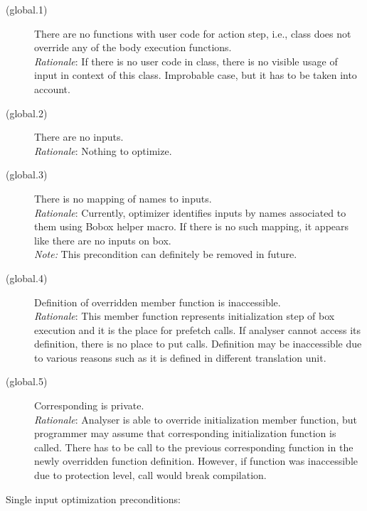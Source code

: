 \begin{description}
\item[(global.1)]{There are no functions with user code for action step, i.e., class does not override any of the body execution functions.\\
\emph{Rationale}: If there is no user code in class, there is no visible usage of input in context of this class. Improbable case, but it has to be taken into account. 
}

\item[(global.2)]{There are no inputs.\\
\emph{Rationale}: Nothing to optimize. 
}

\item[(global.3)]{There is no mapping of names to inputs.\\
\emph{Rationale}: Currently, optimizer identifies inputs by names associated to them using Bobox helper macro. If there is no such mapping, it appears like there are no inputs on box.\\
\emph{Note:} This precondition can definitely be removed in future.
}

\item[(global.4)]{Definition of overridden  member function is inaccessible.\\
\emph{Rationale}: This member function represents initialization step of box execution and it is the place for prefetch calls. If analyser cannot access its definition, there is no place to put calls. Definition may be inaccessible due to various reasons such as it is defined in different translation unit.
}

\item[(global.5)]{Corresponding  is private.\\
\emph{Rationale}: Analyser is able to override initialization member function, but programmer may assume that corresponding initialization function is called. There has to be call to the previous corresponding function in the newly overridden function definition. However, if function was inaccessible due to protection level, call would break compilation.
}
\end{description}

Single input optimization preconditions:


